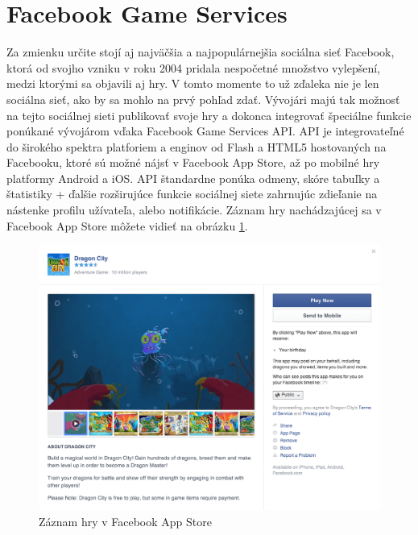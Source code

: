 \section{Facebook Game Services}
Za zmienku určite stojí aj najväčšia a najpopulárnejšia sociálna sieť Facebook, ktorá od svojho vzniku v roku 2004 pridala nespočetné množstvo vylepšení, medzi ktorými sa objavili aj hry. V tomto momente to už zďaleka nie je len sociálna sieť, ako by sa mohlo na prvý pohľad zdať. Vývojári majú tak možnosť na tejto sociálnej sieti publikovať svoje hry a dokonca integrovať špeciálne funkcie ponúkané vývojárom vďaka Facebook Game Services API. API je integrovateľné do širokého spektra platforiem a enginov od Flash a HTML5 hostovaných na Facebooku, ktoré sú možné nájsť v Facebook App Store, až po mobilné hry platformy Android a iOS. API štandardne ponúka odmeny, skóre tabuľky a štatistiky + ďalšie rozširujúce funkcie sociálnej siete zahrnujúc zdieľanie na nástenke profilu užívateľa, alebo notifikácie. Záznam hry nachádzajúcej sa v Facebook App Store môžete vidieť na obrázku \ref{fig:facebook}.
\begin{figure}[h]
  \centering
  \includegraphics[scale=0.17]{fig/facebook.png}
  \caption{Záznam hry v Facebook App Store}
  \label{fig:facebook}
\end{figure}

